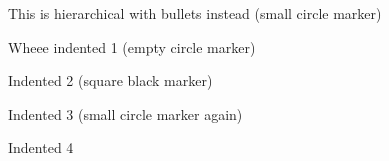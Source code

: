 \documentclass[letterpaper,portrait,12pt]{article}
\begin{document}
\setlength{\oddsidemargin}{0.7874in-1in}
\setlength{\textwidth}{\paperwidth - 0.7874in-0.7874in}

\begin{flushleft}
	This is hierarchical with bullets instead (small circle marker)
\end{flushleft}


\begin{flushleft}
	Wheee indented 1 (empty circle marker)
\end{flushleft}


\begin{flushleft}
	Indented 2 (square black marker)
\end{flushleft}


\begin{flushleft}
	Indented 3 (small circle marker again)
\end{flushleft}


\begin{flushleft}
	Indented 4
\end{flushleft}


\begin{flushleft}
	
\end{flushleft}
\end{document}
